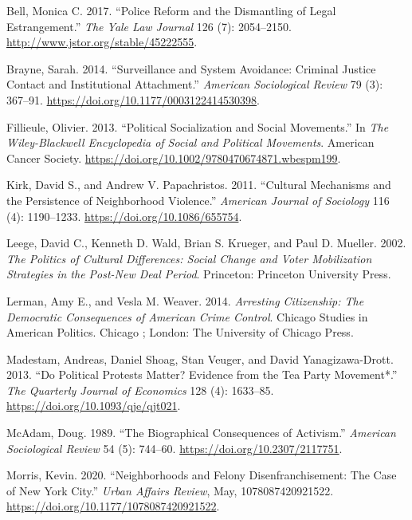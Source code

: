 \documentclass[
  12pt,
]{article}
\newlength{\cslhangindent}
\newenvironment{cslreferences}%
  {\setlength{\parindent}{0pt}%
  \everypar{\setlength{\hangindent}{\cslhangindent}}\ignorespaces}%
  {\par}
\begin{document}
\hypertarget{refs}{}
\begin{cslreferences}
\leavevmode\hypertarget{ref-Bell2017}{}%
Bell, Monica C. 2017. ``Police Reform and the Dismantling of Legal Estrangement.'' \emph{The Yale Law Journal} 126 (7): 2054--2150. \url{http://www.jstor.org/stable/45222555}.

\leavevmode\hypertarget{ref-Brayne2014}{}%
Brayne, Sarah. 2014. ``Surveillance and System Avoidance: Criminal Justice Contact and Institutional Attachment.'' \emph{American Sociological Review} 79 (3): 367--91. \url{https://doi.org/10.1177/0003122414530398}.

\leavevmode\hypertarget{ref-Fillieule2013}{}%
Fillieule, Olivier. 2013. ``Political Socialization and Social Movements.'' In \emph{The Wiley-Blackwell Encyclopedia of Social and Political Movements}. American Cancer Society. \url{https://doi.org/10.1002/9780470674871.wbespm199}.

\leavevmode\hypertarget{ref-Kirk2011}{}%
Kirk, David S., and Andrew V. Papachristos. 2011. ``Cultural Mechanisms and the Persistence of Neighborhood Violence.'' \emph{American Journal of Sociology} 116 (4): 1190--1233. \url{https://doi.org/10.1086/655754}.

\leavevmode\hypertarget{ref-Leege2002}{}%
Leege, David C., Kenneth D. Wald, Brian S. Krueger, and Paul D. Mueller. 2002. \emph{The Politics of Cultural Differences: Social Change and Voter Mobilization Strategies in the Post-New Deal Period}. Princeton: Princeton University Press.

\leavevmode\hypertarget{ref-Lerman2014}{}%
Lerman, Amy E., and Vesla M. Weaver. 2014. \emph{Arresting Citizenship: The Democratic Consequences of American Crime Control}. Chicago Studies in American Politics. Chicago ; London: The University of Chicago Press.

\leavevmode\hypertarget{ref-Madestam2013}{}%
Madestam, Andreas, Daniel Shoag, Stan Veuger, and David Yanagizawa-Drott. 2013. ``Do Political Protests Matter? Evidence from the Tea Party Movement*.'' \emph{The Quarterly Journal of Economics} 128 (4): 1633--85. \url{https://doi.org/10.1093/qje/qjt021}.

\leavevmode\hypertarget{ref-McAdam1989}{}%
McAdam, Doug. 1989. ``The Biographical Consequences of Activism.'' \emph{American Sociological Review} 54 (5): 744--60. \url{https://doi.org/10.2307/2117751}.

\leavevmode\hypertarget{ref-Morris2020}{}%
Morris, Kevin. 2020. ``Neighborhoods and Felony Disenfranchisement: The Case of New York City.'' \emph{Urban Affairs Review}, May, 1078087420921522. \url{https://doi.org/10.1177/1078087420921522}.


\end{cslreferences}
\end{document}
